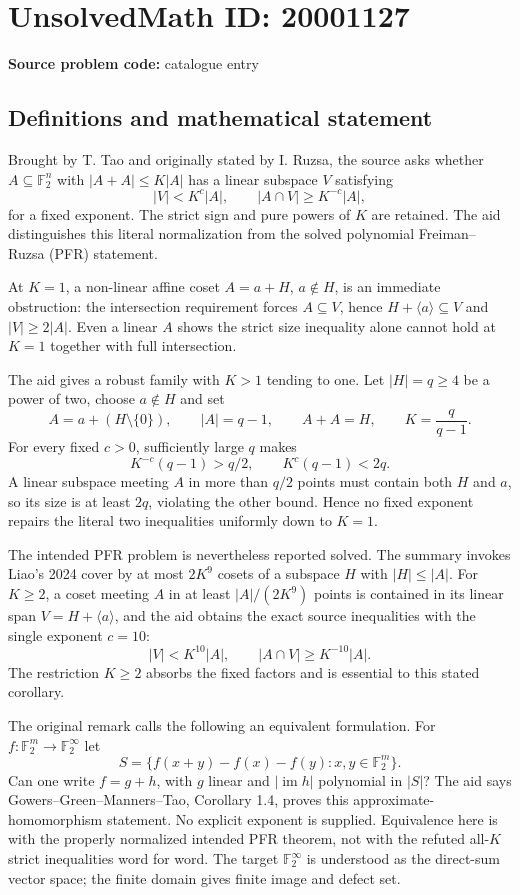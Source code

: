 \documentclass[11pt]{article}
\newcommand{\F}{\mathbb{F}}
\begin{document}
\section*{UnsolvedMath ID: 20001127}
\textbf{Source problem code:} catalogue entry
\subsection{Definitions and mathematical statement}
Brought by T. Tao and originally stated by I. Ruzsa, the source asks whether $A\subseteq\F_2^n$ with $|A+A|\leq K|A|$ has a linear subspace $V$ satisfying
\[
 |V|<K^c|A|,\qquad |A\cap V|\geq K^{-c}|A|,
\]
for a fixed exponent. The strict sign and pure powers of $K$ are retained. The aid distinguishes this literal normalization from the solved polynomial Freiman--Ruzsa (PFR) statement.

At $K=1$, a non-linear affine coset $A=a+H$, $a\notin H$, is an immediate obstruction: the intersection requirement forces $A\subseteq V$, hence $H+\langle a\rangle\subseteq V$ and $|V|\geq2|A|$. Even a linear $A$ shows the strict size inequality alone cannot hold at $K=1$ together with full intersection.

The aid gives a robust family with $K>1$ tending to one. Let $|H|=q\geq4$ be a power of two, choose $a\notin H$ and set
\[
 A=a+(H\setminus\{0\}),\qquad |A|=q-1,\qquad A+A=H,
 \qquad K=\frac q{q-1}.
\]
For every fixed $c>0$, sufficiently large $q$ makes
\[
 K^{-c}(q-1)>q/2,\qquad K^c(q-1)<2q.
\]
A linear subspace meeting $A$ in more than $q/2$ points must contain both $H$ and $a$, so its size is at least $2q$, violating the other bound. Hence no fixed exponent repairs the literal two inequalities uniformly down to $K=1$.

The intended PFR problem is nevertheless reported solved. The summary invokes Liao's 2024 cover by at most $2K^9$ cosets of a subspace $H$ with $|H|\leq|A|$. For $K\geq2$, a coset meeting $A$ in at least $|A|/(2K^9)$ points is contained in its linear span $V=H+\langle a\rangle$, and the aid obtains the exact source inequalities with the single exponent $c=10$:
\[
 |V|<K^{10}|A|,\qquad |A\cap V|\geq K^{-10}|A|.
\]
The restriction $K\geq2$ absorbs the fixed factors and is essential to this stated corollary.

The original remark calls the following an equivalent formulation. For $f:\F_2^m\to\F_2^\infty$ let
\[
 S=\{f(x+y)-f(x)-f(y):x,y\in\F_2^m\}.
\]
Can one write $f=g+h$, with $g$ linear and $|\operatorname{im}h|$ polynomial in $|S|$? The aid says Gowers--Green--Manners--Tao, Corollary 1.4, proves this approximate-homomorphism statement. No explicit exponent is supplied. Equivalence here is with the properly normalized intended PFR theorem, not with the refuted all-$K$ strict inequalities word for word. The target $\F_2^\infty$ is understood as the direct-sum vector space; the finite domain gives finite image and defect set.
\end{document}
